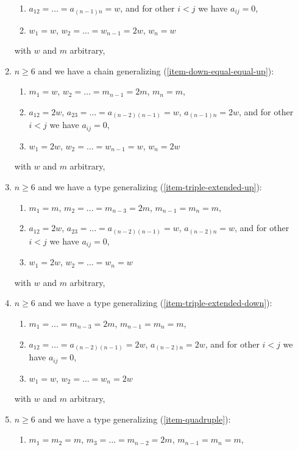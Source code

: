 \begin{lemma}
\begin{enumerate}
\begin{enumerate}
\item $a_{12} = \ldots = a_{(n - 1) n} = w$,
and for other $i < j$ we have $a_{ij} = 0$,
\item $w_1 = w$, $w_2 = \ldots = w_{n - 1} = 2w$, $w_n = w$
\end{enumerate}
with $w$ and $m$ arbitrary,
\item
\label{item-down-chain-equal-up}
$n \geq 6$ and we have a chain generalizing (\ref{item-down-equal-equal-up}):
\begin{enumerate}
\item $m_1 = w$, $w_2 = \ldots = m_{n - 1} = 2m$, $m_n = m$,
\item $a_{12} = 2w$, $a_{23} = \ldots = a_{(n - 2) (n - 1)} = w$,
$a_{(n - 1) n} = 2w$, and for other $i < j$ we have $a_{ij} = 0$,
\item $w_1 = 2w$, $w_2 = \ldots = w_{n - 1} = w$, $w_n = 2w$
\end{enumerate}
with $w$ and $m$ arbitrary,
\item
\label{item-Dn-extended-up}
$n \geq 6$ and we have a type generalizing (\ref{item-triple-extended-up}):
\begin{enumerate}
\item $m_1 = m$, $m_2 = \ldots = m_{n - 3} = 2m$, $m_{n - 1} = m_n = m$,
\item $a_{12} = 2w$, $a_{23} = \ldots = a_{(n - 2) (n - 1)} = w$,
$a_{(n - 2) n} = w$, and for other $i < j$ we have $a_{ij} = 0$,
\item $w_1 = 2w$, $w_2 = \ldots = w_n = w$
\end{enumerate}
with $w$ and $m$ arbitrary,
\item
\label{item-Dn-extended-down}
$n \geq 6$ and we have a type generalizing (\ref{item-triple-extended-down}):
\begin{enumerate}
\item $m_1 = \ldots = m_{n - 3} = 2m$, $m_{n - 1} = m_n = m$,
\item $a_{12} = \ldots = a_{(n - 2) (n - 1)} = 2w$,
$a_{(n - 2) n} = 2w$, and for other $i < j$ we have $a_{ij} = 0$,
\item $w_1 = w$, $w_2 = \ldots = w_n = 2w$
\end{enumerate}
with $w$ and $m$ arbitrary,
\item
\label{item-double-triple}
$n \geq 6$ and we have a type generalizing (\ref{item-quadruple}):
\begin{enumerate}
\item $m_1 = m_2 = m$, $m_3 = \ldots = m_{n - 2} = 2m$, $m_{n - 1} = m_n = m$,

\end{enumerate}
\end{enumerate}
\end{lemma}
